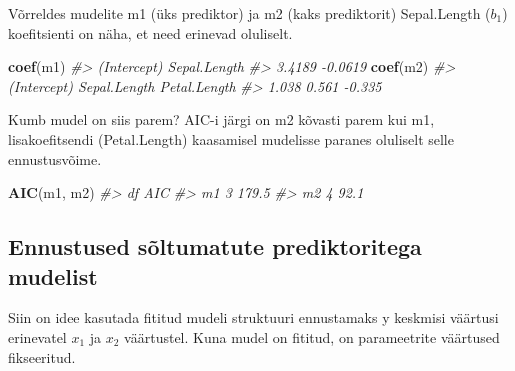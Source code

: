 \documentclass[]{book}
\newenvironment{Shaded}{\begin{snugshade}}{\end{snugshade}}
\newcommand{\CommentTok}[1]{\textcolor[rgb]{0.56,0.35,0.01}{\textit{#1}}}
\newcommand{\KeywordTok}[1]{\textcolor[rgb]{0.13,0.29,0.53}{\textbf{#1}}}
\newcommand{\NormalTok}[1]{#1}
\begin{document}
Võrreldes mudelite m1 (üks prediktor) ja m2 (kaks prediktorit) Sepal.Length (\(b_1\)) koefitsienti on näha, et need erinevad oluliselt.

\begin{Shaded}
\begin{Highlighting}[]
\KeywordTok{coef}\NormalTok{(m1)}
\CommentTok{#>  (Intercept) Sepal.Length }
\CommentTok{#>       3.4189      -0.0619}
\KeywordTok{coef}\NormalTok{(m2)}
\CommentTok{#>  (Intercept) Sepal.Length Petal.Length }
\CommentTok{#>        1.038        0.561       -0.335}
\end{Highlighting}
\end{Shaded}

Kumb mudel on siis parem?
AIC-i järgi on m2 kõvasti parem kui m1, lisakoefitsendi (Petal.Length) kaasamisel mudelisse paranes oluliselt selle ennustusvõime.

\begin{Shaded}
\begin{Highlighting}[]
\KeywordTok{AIC}\NormalTok{(m1, m2)}
\CommentTok{#>    df   AIC}
\CommentTok{#> m1  3 179.5}
\CommentTok{#> m2  4  92.1}
\end{Highlighting}
\end{Shaded}

\hypertarget{ennustused-soltumatute-prediktoritega-mudelist}{%
\subsection*{Ennustused sõltumatute prediktoritega mudelist}\label{ennustused-soltumatute-prediktoritega-mudelist}}

Siin on idee kasutada fititud mudeli struktuuri ennustamaks y keskmisi väärtusi erinevatel \(x_1\) ja \(x_2\) väärtustel.
Kuna mudel on fititud, on parameetrite väärtused fikseeritud.
\end{document}
